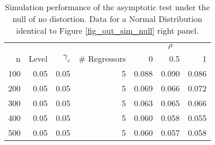 \begin{table}
\small
\caption{Simulation performance of the asymptotic test under the null of no distortion. Data for a Normal Distribution identical to Figure \ref{fig_out_sim_null} right panel.}
\label{fig_out_sim_null_tabright}
 \parbox{0.99\textwidth}{
\centering
\begin{tabular}{rrrrrrr}
\toprule
\multicolumn{4}{c}{ } & \multicolumn{3}{c}{$\rho$} \\
\cmidrule(l{3pt}r{3pt}){5-7}
n & Level & $\gamma_c$ & \# Regressors & 0 & 0.5 & 1\\
\midrule
100 & 0.05 & 0.05 & 5 & 0.088 & 0.090 & 0.086\\
200 & 0.05 & 0.05 & 5 & 0.069 & 0.066 & 0.072\\
300 & 0.05 & 0.05 & 5 & 0.063 & 0.065 & 0.066\\
400 & 0.05 & 0.05 & 5 & 0.060 & 0.058 & 0.055\\
500 & 0.05 & 0.05 & 5 & 0.060 & 0.057 & 0.058\\
\bottomrule
\end{tabular}
}
 \end{table}